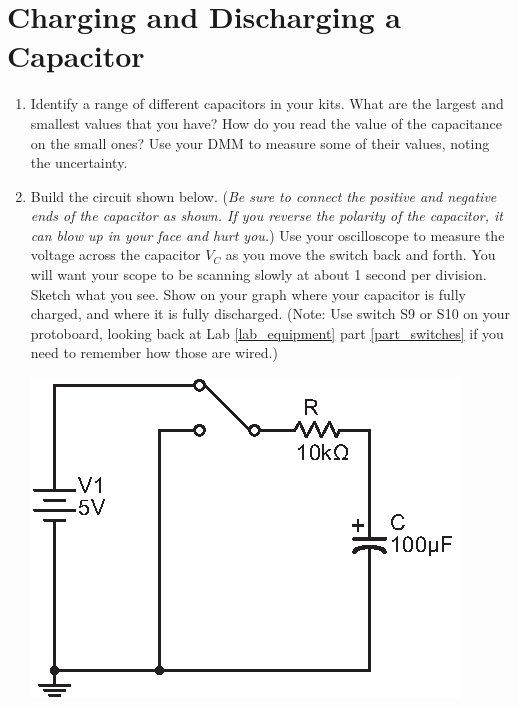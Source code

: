 \section{Charging and Discharging a Capacitor}
\label{lab_capacitors}


\bigskip

\begin{enumerate}[wide]

\item Identify a range of different capacitors in your kits.  What are the largest and smallest values that you have? How do you read the value of the capacitance on the small ones?  Use your DMM to measure some of their values, noting the uncertainty. 

\item Build the circuit shown below.  (\textit{Be sure to connect the positive and negative ends of the capacitor as shown.  If you reverse the polarity of the capacitor, it can blow up in your face and hurt you.})  Use your oscilloscope to measure the voltage across the capacitor $V_C$ as you move the switch back and forth.  You will want your scope to be scanning slowly at about 1 second per division.  Sketch what you see.  Show on your graph where your capacitor is fully charged, and where it is fully discharged.  (Note: Use switch S9 or S10 on your protoboard, looking back at Lab \ref{lab_equipment} part \ref{part_switches} if you need to remember how those are wired.) \label{part_rc_circuit}
\begin{center}
\includegraphics{capacitors/single_dc_capacitor.eps}
\hspace{0.5in}
\end{center}


\end{enumerate}
